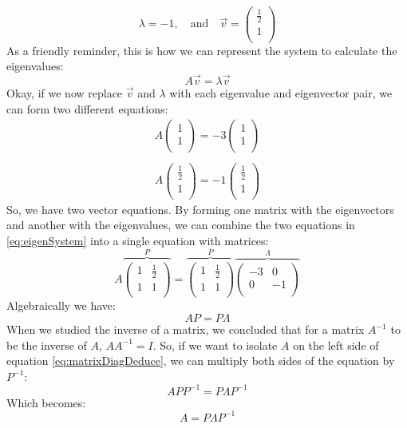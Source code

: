 \documentclass[600paper, 11pt,twoside,openany]{kdp}
\begin{document}
\[
 \lambda = -1, \quad \textrm{and}  \quad \overrightarrow{v}  =  \begin{pmatrix}
\frac{1}{2}  \\
1 \\
\end{pmatrix} \]
\indent As a friendly reminder, this is how we can represent the system to calculate the eigenvalues:
\[A\overrightarrow{v} = \lambda \overrightarrow{v} \]
\indent Okay, if we now replace $\overrightarrow{v}$ and $\lambda$ with each eigenvalue and eigenvector pair, we can form two different equations:
\begin{equation}\label{eq:eigenSystem}
\begin{split}
A\begin{pmatrix}
1  \\
1 \\
\end{pmatrix} = -3\begin{pmatrix}
1  \\
1 \\
\end{pmatrix}\\
\\
A\begin{pmatrix}
\frac{1}{2}  \\
1 \\
\end{pmatrix} = -1\begin{pmatrix}
\frac{1}{2}  \\
1 \\
\end{pmatrix}
\end{split}  
\end{equation}
\indent So, we have two vector equations. By forming one matrix with the eigenvectors and another with the eigenvalues, we can combine the two equations in \ref{eq:eigenSystem} into a single equation with matrices:
\[A \overbrace{\begin{pmatrix}
1 & \frac{1}{2} \\
1 & 1 \\
\end{pmatrix}}^P  =  \overbrace{\begin{pmatrix}
1 & \frac{1}{2} \\
1 & 1 \\
\end{pmatrix}}^P \overbrace{\begin{pmatrix}
-3 & 0 \\
0 & -1 \\
\end{pmatrix}}^\Lambda
\]
\indent Algebraically we have:
\begin{equation}
AP=P\Lambda \label{eq:matrixDiagDeduce}
\end{equation}
\indent When we studied the inverse of a matrix, we concluded that for a matrix $A^{-1}$ to be the inverse of $A$, $AA^{-1} = I$. So, if we want to isolate $A$ on the left side of equation \ref{eq:matrixDiagDeduce}, we can multiply both sides of the equation by $P^{-1}$:
\[
APP^{-1} = P \Lambda P^{-1}
\]
\indent Which becomes:
\begin{equation}\label{eq:matrixDiag}
A = P \Lambda P^{-1} 
\end{equation}
\end{document}
